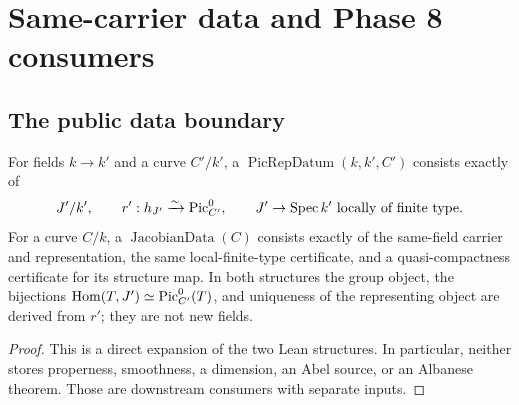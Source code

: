 \chapter{Same-carrier data and Phase 8 consumers}
\label{route-ch-handoff}

\section{The public data boundary}

\begin{definition}
  \label{route-def-public-data}
  \leanok

  For fields \(k\to k'\) and a curve \(C'/k'\), a
  \(\operatorname{PicRepDatum}(k,k',C')\) consists exactly of
  \[
    J'/k',\qquad
    r':h_{J'}\xrightarrow{\sim}\operatorname{Pic}^0_{C'},\qquad
    J'\to\operatorname{Spec} k'\text{ locally of finite type}.
  \]
  For a curve \(C/k\), a \(\operatorname{JacobianData}(C)\) consists exactly
  of the same-field carrier and representation, the same local-finite-type
  certificate, and a quasi-compactness certificate for its structure map.
  In both structures the group object, the bijections
  \(\operatorname{Hom}(T,J')\simeq\operatorname{Pic}^0_{C'}(T)\), and uniqueness of the
  representing object are derived from \(r'\); they are not new fields.
\end{definition}

\begin{proof}
  This is a direct expansion of the two Lean structures.  In particular,
  neither stores properness, smoothness, a dimension, an Abel source, or an
  Albanese theorem.  Those are downstream consumers with separate inputs.
\end{proof}

